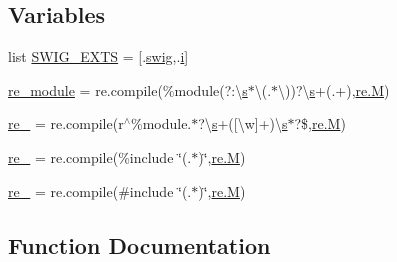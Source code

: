 \subsection*{Variables}
\begin{DoxyCompactItemize}
\item 
list \hyperlink{namespacewaflib_1_1extras_1_1swig_aac124916bd124dbb04928162df660797}{S\+W\+I\+G\+\_\+\+E\+X\+TS} = \mbox{[}\textquotesingle{}.\hyperlink{classwaflib_1_1extras_1_1swig_1_1swig}{swig}\textquotesingle{},\textquotesingle{}.\hyperlink{checksum_8c_ab80e330a3bc9e38c1297fe17381e92b4}{i}\textquotesingle{}\mbox{]}
\item 
\hyperlink{namespacewaflib_1_1extras_1_1swig_a728a00d859d64d3d29e24f5e1adb520d}{re\+\_\+module} = re.\+compile(\textquotesingle{}\%module(?\+:\textbackslash{}\hyperlink{lib_2expat_8h_a755339d27872b13735c2cab829e47157}{s}$\ast$\textbackslash{}(.$\ast$\textbackslash{}))?\textbackslash{}\hyperlink{lib_2expat_8h_a755339d27872b13735c2cab829e47157}{s}+(.+)\textquotesingle{},\hyperlink{rfft2d_test_m_l_8m_aad05f78187c942f9dd521605fa81f1ba}{re.\+M})
\item 
\hyperlink{namespacewaflib_1_1extras_1_1swig_a257ad2c722a2e8c04594b94b1b7cf3eb}{re\+\_} = re.\+compile(r\textquotesingle{}$^\wedge$\%module.$\ast$?\textbackslash{}\hyperlink{lib_2expat_8h_a755339d27872b13735c2cab829e47157}{s}+(\mbox{[}\textbackslash{}w\mbox{]}+)\textbackslash{}\hyperlink{lib_2expat_8h_a755339d27872b13735c2cab829e47157}{s}$\ast$?\$\textquotesingle{},\hyperlink{rfft2d_test_m_l_8m_aad05f78187c942f9dd521605fa81f1ba}{re.\+M})
\item 
\hyperlink{namespacewaflib_1_1extras_1_1swig_a282b45da05537b20a1de76b74c2e9faf}{re\+\_} = re.\+compile(\textquotesingle{}\%include \char`\"{}(.$\ast$)\char`\"{}\textquotesingle{},\hyperlink{rfft2d_test_m_l_8m_aad05f78187c942f9dd521605fa81f1ba}{re.\+M})
\item 
\hyperlink{namespacewaflib_1_1extras_1_1swig_a1828f0c47c854a5b8c23bc029a59f5ec}{re\+\_} = re.\+compile(\textquotesingle{}\#include \char`\"{}(.$\ast$)\char`\"{}\textquotesingle{},\hyperlink{rfft2d_test_m_l_8m_aad05f78187c942f9dd521605fa81f1ba}{re.\+M})
\end{DoxyCompactItemize}


\subsection{Function Documentation}
